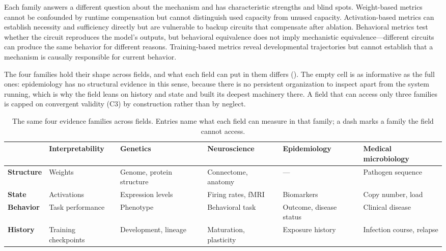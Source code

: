 \documentclass{article}
\begin{document}
Each family answers a different question about the mechanism and has characteristic strengths and blind spots. Weight-based metrics cannot be confounded by runtime compensation but cannot distinguish used capacity from unused capacity. Activation-based metrics can establish necessity and sufficiency directly but are vulnerable to backup circuits that compensate after ablation. Behavioral metrics test whether the circuit reproduces the model's outputs, but behavioral equivalence does not imply mechanistic equivalence---different circuits can produce the same behavior for different reasons. Training-based metrics reveal developmental trajectories but cannot establish that a mechanism is causally responsible for current behavior.

The four families hold their shape across fields, and what each field can put in them differs (). The empty cell is as informative as the full ones: epidemiology has no structural evidence in this sense, because there is no persistent organization to inspect apart from the system running, which is why the field leans on history and state and built its deepest machinery there. A field that can access only three families is capped on convergent validity (C3) by construction rather than by neglect.

\begin{table}[H]
\centering\small
\caption{The same four evidence families across fields. Entries name what each field can measure in that family; a dash marks a family the field cannot access.}
\label{tab:families-domains}
\renewcommand{\arraystretch}{1.2}
\begin{tabular}{@{}l>{\raggedright\arraybackslash}p{2.2cm}>{\raggedright\arraybackslash}p{2.2cm}>{\raggedright\arraybackslash}p{2.2cm}>{\raggedright\arraybackslash}p{2.2cm}>{\raggedright\arraybackslash}p{2.4cm}@{}}
\toprule
& \textbf{Interpretability} & \textbf{Genetics} & \textbf{Neuroscience} & \textbf{Epidemiology} & \textbf{Medical microbiology} \\
\midrule
\textbf{Structure} & Weights & Genome, protein structure & Connectome, anatomy & --- & Pathogen sequence \\
\midrule
\textbf{State} & Activations & Expression levels & Firing rates, fMRI & Biomarkers & Copy number, load \\
\midrule
\textbf{Behavior} & Task performance & Phenotype & Behavioral task & Outcome, disease status & Clinical disease \\
\midrule
\textbf{History} & Training checkpoints & Development, lineage & Maturation, plasticity & Exposure history & Infection course, relapse \\
\bottomrule
\end{tabular}
\end{table}
\end{document}
